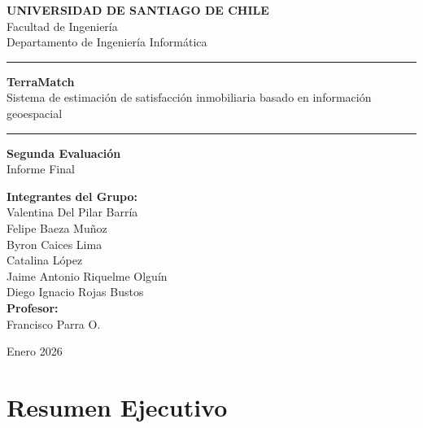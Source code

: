 \documentclass[11pt,letterpaper]{article}
\begin{document}
\begin{titlepage}
\centering
\vspace*{1cm}

{\Large \textbf{UNIVERSIDAD DE SANTIAGO DE CHILE}}\\
Facultad de Ingeniería\\
Departamento de Ingeniería Informática

\vspace{3cm}

\rule{\textwidth}{0.5mm}

\vspace{0.5cm}
{\LARGE \textbf{TerraMatch}}\\
\vspace{0.3cm}
{\Large Sistema de estimación de satisfacción inmobiliaria basado en información geoespacial}

\vspace{0.5cm}
\rule{\textwidth}{0.5mm}

\vspace{1.5cm}

{\Large \textbf{Segunda Evaluación}}\\
Informe Final

\vspace{1.5cm}

\begin{flushleft}
\textbf{Integrantes del Grupo:}\\
Valentina Del Pilar Barría\\
Felipe Baeza Muñoz\\
Byron Caices Lima\\
Catalina López\\
Jaime Antonio Riquelme Olguín\\
Diego Ignacio Rojas Bustos\\[0.5cm]

\textbf{Profesor:}\\
Francisco Parra O.
\end{flushleft}

\vfill
{\large Enero 2026}
\end{titlepage}

\newpage
\section*{Resumen Ejecutivo}
\end{document}
